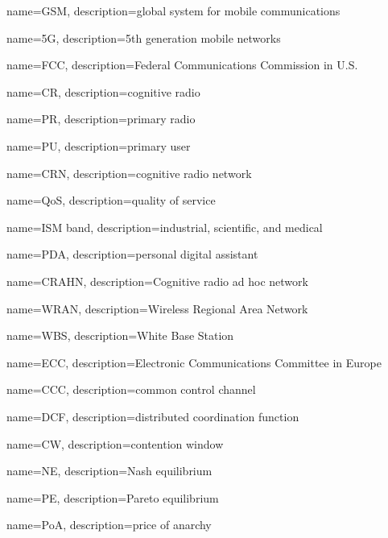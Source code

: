 {
    name=GSM,
    description={global system for mobile communications}
}
 
 
 
{
    name=5G,
    description={5th generation mobile networks}
}
 
 
 
 
 


{
    name=FCC,
    description={Federal Communications Commission in U.S.}
}
 
 
{
    name=CR,
    description={cognitive radio}
}
 
{
    name=PR,
    description={primary radio}
} 
 
{
    name=PU,
    description={primary user}
}

 
{
    name=CRN,
    description={cognitive radio network}
}
 
 
{
    name=QoS,
    description={quality of service}
}


{
    name=ISM band,
    description={industrial, scientific, and medical}
}

{
    name=PDA,
    description={personal digital assistant}
}


{
    name=CRAHN,
    description={Cognitive radio ad hoc network}
}


{
    name=WRAN,
    description={Wireless Regional Area Network}
}


{
    name=WBS,
    description={White Base Station}
}


{
    name=ECC,
    description={Electronic Communications Committee in Europe}
}


{
    name=CCC,
    description={common control channel}
}


{
    name=DCF,
    description={distributed coordination function}
}


{
    name=CW,
    description={contention window}
}


{
    name=NE,
    description={Nash equilibrium}
}

{
    name=PE,
    description={Pareto equilibrium}
}


{
    name=PoA,
    description={price of anarchy}
}


